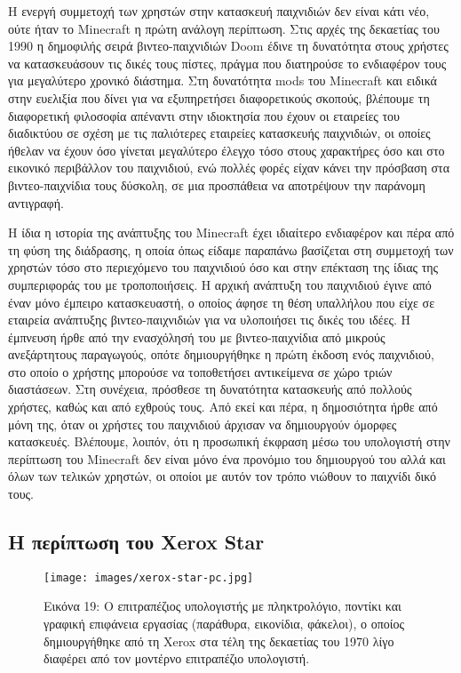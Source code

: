 \documentclass[
]{article}
\begin{document}
Η ενεργή συμμετοχή των χρηστών στην κατασκευή παιχνιδιών δεν είναι κάτι
νέο, ούτε ήταν το Minecraft η πρώτη ανάλογη περίπτωση. Στις αρχές της
δεκαετίας του 1990 η δημοφιλής σειρά βιντεο-παιχνιδιών Doom έδινε τη
δυνατότητα στους χρήστες να κατασκευάσουν τις δικές τους πίστες, πράγμα
που διατηρούσε το ενδιαφέρον τους για μεγαλύτερο χρονικό διάστημα. Στη
δυνατότητα mods του Minecraft και ειδικά στην ευελιξία που δίνει για να
εξυπηρετήσει διαφορετικούς σκοπούς, βλέπουμε τη διαφορετική φιλοσοφία
απέναντι στην ιδιοκτησία που έχουν οι εταιρείες του διαδικτύου σε σχέση
με τις παλιότερες εταιρείες κατασκευής παιχνιδιών, οι οποίες ήθελαν να
έχουν όσο γίνεται μεγαλύτερο έλεγχο τόσο στους χαρακτήρες όσο και στο
εικονικό περιβάλλον του παιχνιδιού, ενώ πολλές φορές είχαν κάνει την
πρόσβαση στα βιντεο-παιχνίδια τους δύσκολη, σε μια προσπάθεια να
αποτρέψουν την παράνομη αντιγραφή.

Η ίδια η ιστορία της ανάπτυξης του Minecraft έχει ιδιαίτερο ενδιαφέρον
και πέρα από τη φύση της διάδρασης, η οποία όπως είδαμε παραπάνω
βασίζεται στη συμμετοχή των χρηστών τόσο στο περιεχόμενο του παιχνιδιού
όσο και στην επέκταση της ίδιας της συμπεριφοράς του με τροποποιήσεις. Η
αρχική ανάπτυξη του παιχνιδιού έγινε από έναν μόνο έμπειρο κατασκευαστή,
ο οποίος άφησε τη θέση υπαλλήλου που είχε σε εταιρεία ανάπτυξης
βιντεο-παιχνιδιών για να υλοποιήσει τις δικές του ιδέες. Η έμπνευση ήρθε
από την ενασχόλησή του με βιντεο-παιχνίδια από μικρούς ανεξάρτητους
παραγωγούς, οπότε δημιουργήθηκε η πρώτη έκδοση ενός παιχνιδιού, στο
οποίο ο χρήστης μπορούσε να τοποθετήσει αντικείμενα σε χώρο τριών
διαστάσεων. Στη συνέχεια, πρόσθεσε τη δυνατότητα κατασκευής από πολλούς
χρήστες, καθώς και από εχθρούς τους. Από εκεί και πέρα, η δημοσιότητα
ήρθε από μόνη της, όταν οι χρήστες του παιχνιδιού άρχισαν να δημιουργούν
όμορφες κατασκευές. Βλέπουμε, λοιπόν, ότι η προσωπική έκφραση μέσω του
υπολογιστή στην περίπτωση του Minecraft δεν είναι μόνο ένα προνόμιο του
δημιουργού του αλλά και όλων των τελικών χρηστών, οι οποίοι με αυτόν τον
τρόπο νιώθουν το παιχνίδι δικό τους.

\hypertarget{ux3b7-ux3c0ux3b5ux3c1ux3afux3c0ux3c4ux3c9ux3c3ux3b7-ux3c4ux3bfux3c5-xerox-star}{%
\subsection{Η περίπτωση του Xerox
Star}\label{ux3b7-ux3c0ux3b5ux3c1ux3afux3c0ux3c4ux3c9ux3c3ux3b7-ux3c4ux3bfux3c5-xerox-star}}

\leavevmode{}%
\begin{figure}
\hypertarget{fig:xerox-star-pc}{%
\centering
\texttt{[image: images/xerox-star-pc.jpg]}
\caption{Εικόνα 19: Ο επιτραπέζιος υπολογιστής με πληκτρολόγιο, ποντίκι
και γραφική επιφάνεια εργασίας (παράθυρα, εικονίδια, φάκελοι), ο οποίος
δημιουργήθηκε από τη Xerox στα τέλη της δεκαετίας του 1970 λίγο διαφέρει
από τον μοντέρνο επιτραπέζιο υπολογιστή.}\label{fig:xerox-star-pc}
}
\end{figure}
\end{document}
